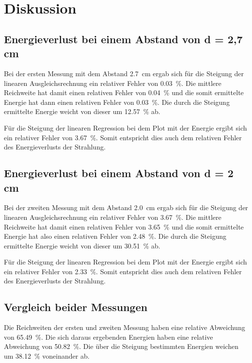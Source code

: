 \section{Diskussion}
\label{sec:Diskussion}

\subsection{Energieverlust bei einem Abstand von d = 2,7 cm}

Bei der ersten Messung mit dem Abstand \SI{2.7}{\centi\meter} ergab sich für die Steigung der linearen Ausgleichsrechnung ein relativer Fehler von \SI{0.03}{\percent}. Die mittlere Reichweite hat damit einen relativen Fehler von \SI{0.04}{\percent } und die somit ermittelte Energie hat dann einen relativen Fehler von \SI{0.03}{\percent}. Die durch die Steigung ermittelte Energie weicht von dieser um \SI{12.57}{\percent} ab. 

\noindent Für die Steigung der linearen Regression bei dem Plot mit der Energie ergibt sich ein relativer Fehler von \SI{3.67}{\percent}. Somit entspricht dies auch dem relativen Fehler des Energieverlusts der Strahlung. 

\subsection{Energieverlust bei einem Abstand von d = 2 cm}

Bei der zweiten Messung mit dem Abstand \SI{2.0}{\centi\meter} ergab sich für die Steigung der linearen Ausgleichsrechnung ein relativer Fehler von \SI{3.67}{\percent}. Die mittlere Reichweite hat damit einen relativen Fehler von \SI{3.65}{\percent } und die somit ermittelte Energie hat also einen relativen Fehler von \SI{2.48}{\percent}. Die durch die Steigung ermittelte Energie weicht von dieser um \SI{30.51}{\percent} ab.

\noindent Für die Steigung der linearen Regression bei dem Plot mit der Energie ergibt sich ein relativer Fehler von \SI{2.33}{\percent}. Somit entspricht dies auch dem relativen Fehler des Energieverlusts der Strahlung.  

\subsection{Vergleich beider Messungen}
Die Reichweiten der ersten und zweiten Messung haben eine relative Abweichung von \SI{65.49}{\percent}. Die sich daraus ergebenden Energien haben eine relative Abweichung von \SI{50.82}{\percent}. Die über die Steigung bestimmten Energien weichen um \SI{38.12}{\percent} voneinander ab. 

